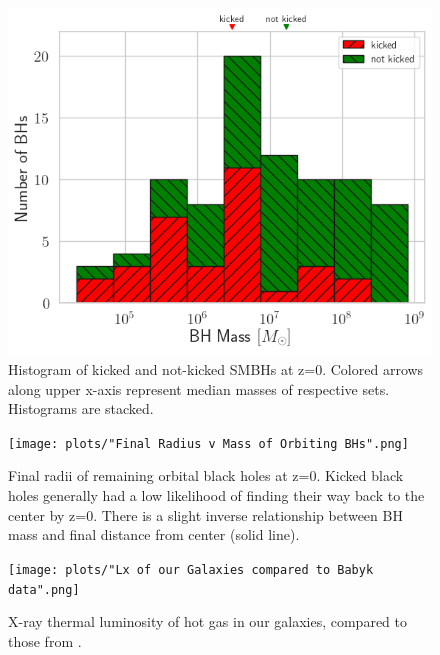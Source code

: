 \documentclass[fleqn,usenatbib,useAMS]{mnras}
\begin{document}
\begin{figure}
\begin{center}
\includegraphics[width=1.0\columnwidth]{plots/kicked_stats.png}
\caption{Histogram of kicked and not-kicked SMBHs at z=0.  Colored arrows along upper x-axis represent median masses of respective sets.  Histograms are stacked.}
\label{fig:kicked_stats}
\end{center}
\end{figure}

\begin{figure}
\begin{center}
\texttt{[image: plots/"Final Radius v Mass of Orbiting BHs".png]}
\caption{Final radii of remaining orbital black holes at z=0.  Kicked black holes generally had a low likelihood of finding their way back to the center by z=0.  There is a slight inverse relationship between BH mass and final distance from center (solid line).}
\label{fig:mvr}
\end{center}
\end{figure}

\begin{figure}
\vspace{20pt}%
\begin{center}
\texttt{[image: plots/"Lx of our Galaxies compared to Babyk data".png]}
\caption{X-ray thermal luminosity of hot gas in our galaxies, compared to those from \citet{2018ApJ...857...32B}.}
\label{fig:galgas1}
\end{center}
\end{figure}
\end{document}
